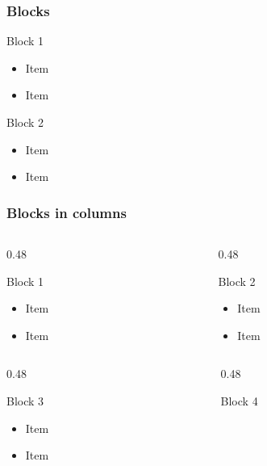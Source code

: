\begin{frame}
\frametitle{Blocks}
\begin{block}{Block 1}
\begin{itemize}
\item Item
\item Item
\end{itemize}
\end{block}
\begin{block}{Block 2}
\begin{itemize}
\item Item
\item Item
\end{itemize}
\end{block}
\end{frame}

\begin{frame}[t]
\frametitle{Blocks in columns}
\begin{columns}[T,onlytextwidth]
\begin{column}{0.48\textwidth}
\begin{block}{Block 1}
\begin{itemize}
\item Item
\item Item
\end{itemize}
\end{block}
\end{column}
\begin{column}{0.48\textwidth}
\begin{block}{Block 2}
\begin{itemize}
\item Item
\item Item
\end{itemize}
\end{block}
\end{column}
\end{columns}
\vspace{0.2cm}
\begin{columns}[T,onlytextwidth]
\begin{column}{0.48\textwidth}
\begin{block}{Block 3}
\begin{itemize}
\item Item
\item Item
\end{itemize}
\end{block}
\end{column}
\begin{column}{0.48\textwidth}
\begin{block}{Block 4}

\end{block}
\end{column}
\end{columns}
\end{frame}
